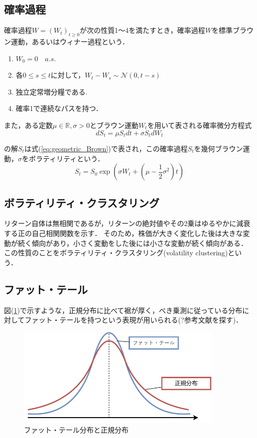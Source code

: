 \documentclass[titlepage]{jsreport}
\begin{document}
\subsection{確率過程}
確率過程$W = (W_t)_{t \geq 0}$が次の性質1～4を満たすとき，確率過程$W$を標準ブラウン運動，あるいはウィナー過程という\cite{stochastic_integration}．
\begin{enumerate}
    \item $W_0 = 0 \quad a.s.$
    \item 各$0 \leq s \leq t$に対して，$W_t - W_s \sim \mathcal{N}(0, t - s)$
    \item 独立定常増分糧である.
    \item 確率1で連続なパスを持つ．
\end{enumerate}

また，ある定数$\mu \in \mathbb{R}, \sigma > 0$とブラウン運動$W_t$を用いて表される確率微分方程式
\begin{equation}
    dS_t = \mu S_t dt + \sigma S_t dW_t \label{eq:geoBrow_equation}
\end{equation}

の解$S_t$は式(\ref{eq:geometric_Brown})で表され，この確率過程$S_t$を幾何ブラウン運動，$\sigma$をボラティリティという\cite{Stochastic_Calculus}．
\begin{equation}
    S_t = S_0 \exp{\left(\sigma W_t + \left( \mu - \frac{1}{2}\sigma^2 \right)t\right)} \label{eq:geometric_Brown}
\end{equation}

\subsection{ボラティリティ・クラスタリング}
リターン自体は無相関であるが，リターンの絶対値やその2乗はゆるやかに減衰する正の自己相関関数を示す\cite{Cont2007}．
そのため，株価が大きく変化した後は大きな変動が続く傾向があり，小さく変動をした後には小さな変動が続く傾向がある\cite{return_correlation}．
この性質のことをボラティリティ・クラスタリング(volatility clustering)という．

\subsection{ファット・テール}
図(\ref{fig:fat_tail})で示すような，正規分布に比べて裾が厚く，べき乗測に従っている分布に対してファット・テールを持つという表現が用いられる(?参考文献を探す)．
\begin{figure}[htbp]
    \centering
    \includegraphics[width=10cm]{fig/fat_tail.drawio.pdf}
    \caption{ファット・テール分布と正規分布}
    \label{fig:fat_tail}
\end{figure}
\end{document}
